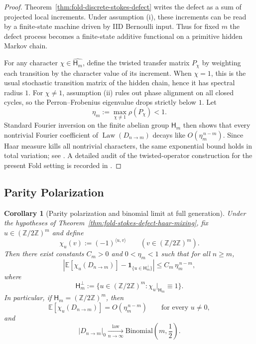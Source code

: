 \documentclass[11pt,letterpaper]{article}
\numberwithin{equation}{section}
\theoremstyle{plain}
\newtheorem{corollary}[theorem]{Corollary}
\theoremstyle{definition}
\theoremstyle{remark}
\newcommand{\ZZ}{\mathbb{Z}}
\newcommand{\EE}{\mathbb{E}}
\DeclareMathOperator{\Law}{Law}
\begin{document}
\begin{proof}
Theorem~\ref{thm:fold-discrete-stokes-defect} writes the defect as a sum of
projected local increments.  Under assumption (i), these increments can be read
by a finite-state machine driven by IID Bernoulli input.  Thus for fixed $m$
the defect process becomes a finite-state additive functional on a primitive
hidden Markov chain.

For any character $\chi\in\widehat{\mathsf{H}_m}$, define the twisted transfer
matrix $P_\chi$ by weighting each transition by the character value of its
increment.  When $\chi=1$, this is the usual stochastic transition matrix of
the hidden chain, hence it has spectral radius $1$.  For $\chi\neq 1$,
assumption (ii) rules out phase alignment on all closed cycles, so the
Perron--Frobenius eigenvalue drops strictly below $1$.  Let
\[
\eta_m:=\max_{\chi\neq 1}\rho(P_\chi)<1.
\]
Standard Fourier inversion on the finite abelian group $\mathsf{H}_m$ then
shows that every nontrivial Fourier coefficient of $\Law(D_{n\to m})$ decays
like $O(\eta_m^{\,n-m})$.  Since Haar measure kills all nontrivial characters,
the same exponential bound holds in total variation; see
\cite[Chapters~12--13]{LevinPeresWilmer2009MarkovMixing}.  A detailed audit of
the twisted-operator construction for the present Fold setting is recorded in
\cite{Internal2026FoldGeneralizedStokesDefectHaarMixing}.
\end{proof}

\subsection{Parity Polarization}

\begin{corollary}[Parity polarization and binomial limit at full generation]
\label{cor:fold-stokes-defect-parity-polarization}
Under the hypotheses of Theorem~\ref{thm:fold-stokes-defect-haar-mixing}, fix
$u\in (\ZZ/2\ZZ)^m$ and define
\[
\chi_u(v):=(-1)^{\langle u,v\rangle}
\qquad (v\in (\ZZ/2\ZZ)^m).
\]
Then there exist constants $C_m>0$ and $0<\eta_m<1$ such that for all $n\ge m$,
\[
\left|
\EE[\chi_u(D_{n\to m})]
-
\mathbf{1}_{\{u\in \mathsf{H}_m^\perp\}}
\right|
\le
C_m\,\eta_m^{\,n-m},
\]
where
\[
\mathsf{H}_m^\perp:=\{u\in(\ZZ/2\ZZ)^m:\chi_u|_{\mathsf{H}_m}\equiv 1\}.
\]
In particular, if $\mathsf{H}_m=(\ZZ/2\ZZ)^m$, then
\[
\EE[\chi_u(D_{n\to m})]=O(\eta_m^{\,n-m})
\qquad\text{for every }u\neq 0,
\]
and
\[
\lvert D_{n\to m}\rvert_0
\xrightarrow[n\to\infty]{\mathrm{law}}
\mathrm{Binomial}\!\left(m,\frac12\right).
\]
\end{corollary}
\end{document}
